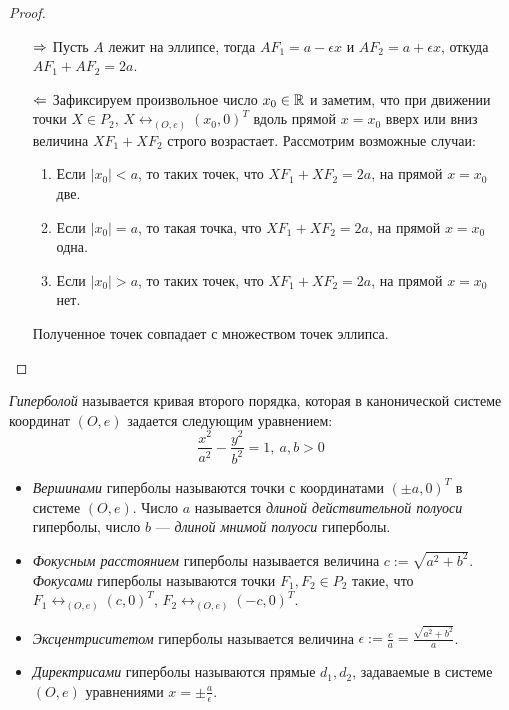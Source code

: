     \begin{proof}~
    	\begin{itemize}
    		\item[$\Rightarrow$] Пусть $A$ лежит на эллипсе, тогда $AF_1 = a - \epsilon x$ и $AF_2 = a + \epsilon x$, откуда $AF_1 + AF_2 = 2a$.
    		\item[$\Leftarrow$] Зафиксируем произвольное число $x_0 \in \mathbb{R}$ и заметим, что при движении точки $X \in P_2$, $X \leftrightarrow_{(O, e)} (x_0, 0)^T$ вдоль прямой $x = x_0$ вверх или вниз величина $XF_1 + XF_2$ строго возрастает. Рассмотрим возможные случаи:
    		\begin{enumerate}
    			\item Если $|x_0| < a$, то таких точек, что $XF_1 + XF_2 = 2a$, на прямой $x = x_0$ две.
    			\item Если $|x_0| = a$, то такая точка, что $XF_1 + XF_2 = 2a$, на прямой $x = x_0$ одна.
    			\item Если $|x_0| > a$, то таких точек, что $XF_1 + XF_2 = 2a$, на прямой $x = x_0$ нет.
    		\end{enumerate}
    	
    	Полученное точек совпадает с множеством точек эллипса.\qedhere
    	\end{itemize}
    \end{proof}
    
    \begin{definition}
    	\textit{Гиперболой} называется кривая второго порядка, которая в канонической системе координат $(O, e)$ задается следующим уравнением:
    	\[\frac{x^2}{a^2} - \frac{y^2}{b^2} = 1,~a, b > 0\]
    	
    	\begin{itemize}
    		\item \textit{Вершинами} гиперболы называются точки с координатами $(\pm a, 0)^T$ в системе $(O, e)$. Число $a$ называется \textit{длиной действительной полуоси} гиперболы, число $b$ --- \textit{длиной мнимой полуоси} гиперболы.
    		
    		\item \textit{Фокусным расстоянием} гиперболы называется величина $c := \sqrt{a^2 + b^2}$. \textit{Фокусами} гиперболы называются точки $F_1, F_2 \in P_2$ такие, что $F_1 \leftrightarrow_{(O, e)} (c, 0)^T$, $F_2 \leftrightarrow_{(O, e)} (-c, 0)^T$.
    		
    		\item \textit{Эксцентриситетом} гиперболы называется величина $\epsilon := \frac{c}{a} = \frac{\sqrt{a^2 + b^2}}{a}$.
    		
    		\item \textit{Директрисами} гиперболы называются прямые $d_1, d_2$, задаваемые в системе $(O, e)$ уравнениями $x = \pm \frac{a}{\epsilon}$.
    	\end{itemize}
    \end{definition}
    
